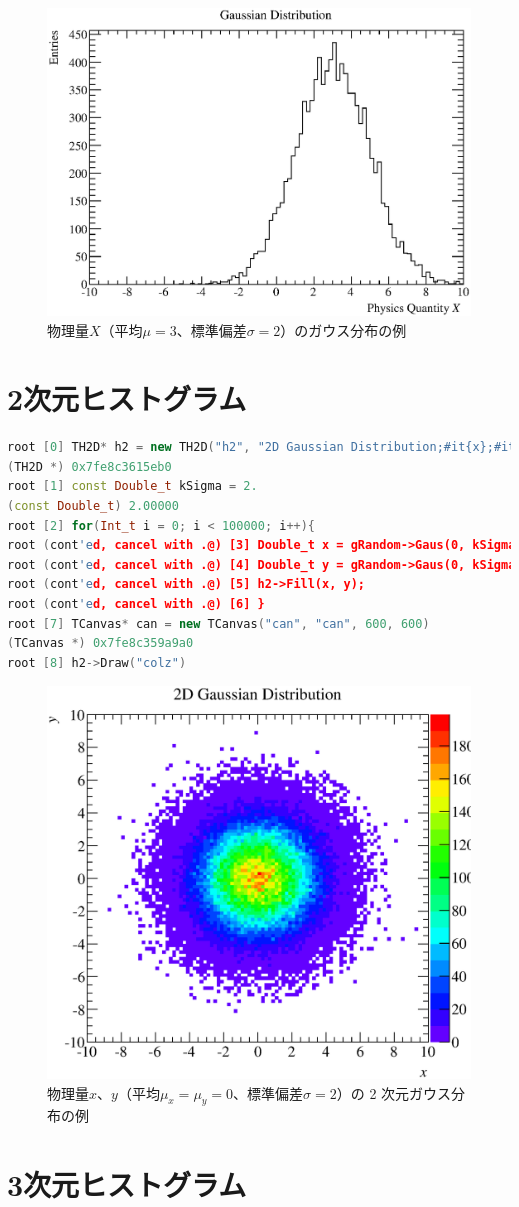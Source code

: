 \begin{figure}
  \centering
  \includegraphics[width=12cm,clip]{fig/TH1D.eps}
  \caption{物理量$X$（平均$\mu = 3$、標準偏差$\sigma = 2$）のガウス分布の例}
  \label{fig_TH1D_eps}
\end{figure}

\section{2次元ヒストグラム}

\begin{lstlisting}[language=c++]
root [0] TH2D* h2 = new TH2D("h2", "2D Gaussian Distribution;#it{x};#it{y};Entries", 100, -10, 10, 100, -10, 10)
(TH2D *) 0x7fe8c3615eb0
root [1] const Double_t kSigma = 2.
(const Double_t) 2.00000
root [2] for(Int_t i = 0; i < 100000; i++){
root (cont'ed, cancel with .@) [3] Double_t x = gRandom->Gaus(0, kSigma);
root (cont'ed, cancel with .@) [4] Double_t y = gRandom->Gaus(0, kSigma);
root (cont'ed, cancel with .@) [5] h2->Fill(x, y);
root (cont'ed, cancel with .@) [6] }
root [7] TCanvas* can = new TCanvas("can", "can", 600, 600)
(TCanvas *) 0x7fe8c359a9a0
root [8] h2->Draw("colz")
\end{lstlisting}

\begin{figure}
  \centering
  \includegraphics[width=12cm,clip]{fig/TH2D.eps}
  \caption{物理量$x$、$y$（平均$\mu_x = \mu_y = 0$、標準偏差$\sigma = 2$）の 2 次元ガウス分布の例}
  \label{fig_TH2D_eps}
\end{figure}

\section{3次元ヒストグラム}
